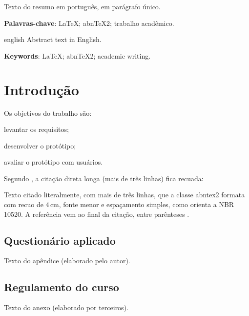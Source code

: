 \documentclass[12pt, a4paper, oneside, english, brazilian]{abntex2}
\begin{document}
\pretextual
\imprimircapa
\imprimirfolhaderosto

\begin{resumo}
Texto do resumo em português, em parágrafo único.

\textbf{Palavras-chave}: LaTeX; abnTeX2; trabalho acadêmico.
\end{resumo}

\begin{resumo}[Abstract]
\begin{otherlanguage*}{english}
Abstract text in English.

\textbf{Keywords}: LaTeX; abnTeX2; academic writing.
\end{otherlanguage*}
\end{resumo}

\listoffigures*       %
\cleardoublepage      %
\listoftables*
\cleardoublepage
\tableofcontents*
\cleardoublepage

\textual
\chapter{Introdução}\label{cap:introducao}

Os objetivos do trabalho são:
\begin{alineas}
  \item levantar os requisitos;
  \item desenvolver o protótipo;
  \item avaliar o protótipo com usuários.
\end{alineas}

Segundo \textcite{ex-livro}, a citação direta longa (mais de três linhas)
fica recuada:
\begin{citacao}
Texto citado literalmente, com mais de três linhas, que a classe abntex2
formata com recuo de 4\,cm, fonte menor e espaçamento simples, como orienta a
NBR 10520. A referência vem ao final da citação, entre parênteses
\cite[p.~35]{ex-livro}.
\end{citacao}

\postextual
\printbibliography[title=Referências]

\begin{apendicesenv}
\chapter{Questionário aplicado}
Texto do apêndice (elaborado pelo autor).
\end{apendicesenv}

\begin{anexosenv}
\chapter{Regulamento do curso}
Texto do anexo (elaborado por terceiros).
\end{anexosenv}
\end{document}
